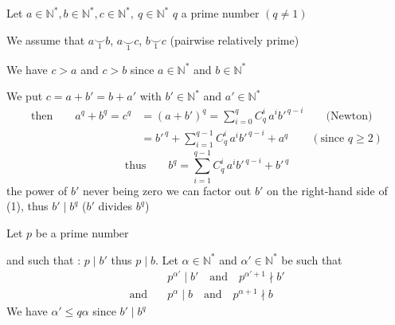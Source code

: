  Let $a\in\mathbb N^*,b\in\mathbb N^*,c\in\mathbb N^*,\ q\in\mathbb N^*$ \quad $q$ a prime number $(q\ne1)$

We assume that $a\mathrel{\underset{1}{\smile}}b$, $a\mathrel{\underset{1}{\smile}}c$, $b\mathrel{\underset{1}{\smile}}c$ (pairwise relatively prime)

We have $c>a$ and $c>b$ since $a\in\mathbb N^*$ and $b\in\mathbb N^*$

We put $c=a+b'=b+a'$ with $b'\in\mathbb N^*$ and $a'\in\mathbb N^*$
\[
\begin{aligned}
\text{then}\qquad a^q+b^q=c^q&=(a+b')^q=\sum_{i=0}^{q}C_q^i\,a^i b'^{\,q-i}\qquad\text{(Newton)}\\
 &=b'^{\,q}+\sum_{i=1}^{q-1}C_q^i\,a^i b'^{\,q-i}+a^q\qquad(\text{since }q\geqslant2)
\end{aligned}
\]
\[
\text{thus}\qquad b^q=\sum_{i=1}^{q-1}C_q^i\,a^i b'^{\,q-i}+b'^{\,q}\tag*{(1)}
\]
the power of $b'$ never being zero we can factor out $b'$ on the right-hand side of (1), thus $b'\mid b^q$ ($b'$ divides $b^q$)

Let $p$ be a prime number %
 and such that : $p\mid b'$ thus $p\mid b$. Let $\alpha\in\mathbb N^*$ and $\alpha'\in\mathbb N^*$ be such that
\[
\begin{aligned}
 &p^{\alpha'}\mid b'\quad\text{and}\quad p^{\alpha'+1}\nmid b'\\
 \text{and}\quad &p^\alpha\mid b\quad\text{and}\quad p^{\alpha+1}\nmid b
\end{aligned}
\]
We have $\alpha'\leqslant q\alpha$ since $b'\mid b^q$

